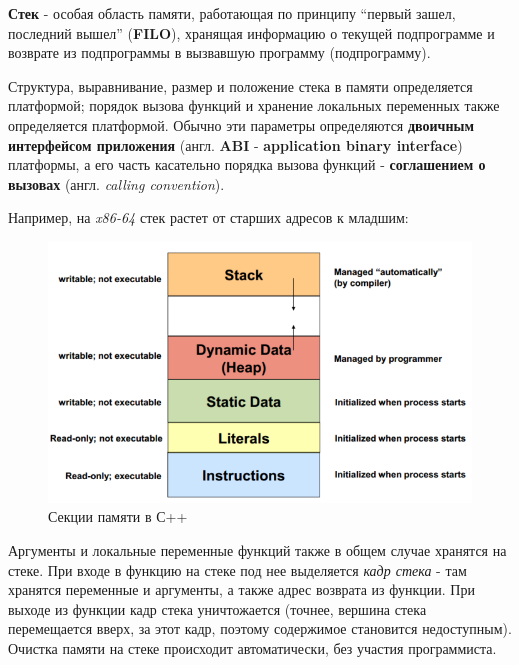 \textbf{Стек} - особая область памяти, работающая по принципу ``первый
зашел, последний вышел'' (\textbf{FILO}), хранящая информацию о текущей
подпрограмме и возврате из подпрограммы в вызвавшую программу
(подпрограмму).

Структура, выравнивание, размер и положение стека в памяти определяется
платформой; порядок вызова функций и хранение локальных переменных также
определяется платформой. Обычно эти параметры определяются
\textbf{двоичным интерфейсом приложения} (англ. \textbf{ABI} -
\textbf{application binary interface}) платформы, а его часть касательно
порядка вызова функций - \textbf{соглашением о вызовах} (англ.
\emph{calling convention}).

Например, на \emph{x86-64} стек растет от старших адресов к младшим:

\begin{figure}
\centering
\includegraphics{./res/mem.png}
\caption{Секции памяти в С++}
\end{figure}

Аргументы и локальные переменные функций также в общем случае хранятся
на стеке. При входе в функцию на стеке под нее выделяется \emph{кадр
стека} - там хранятся переменные и аргументы, а также адрес возврата из
функции. При выходе из функции кадр стека уничтожается (точнее, вершина
стека перемещается вверх, за этот кадр, поэтому содержимое становится
недоступным). Очистка памяти на стеке происходит автоматически, без
участия программиста.
